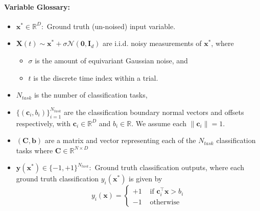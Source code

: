 \documentclass[12pt]{article}
\begin{document}
\paragraph{Variable Glossary: }
\begin{itemize}
    \item $\mathbf x^* \in \mathbb R^D: $ Ground truth (un-noised) input variable.
    \item $\mathbf X(t) \sim \mathbf x^* + \sigma \mathcal N(\mathbf 0, \mathbf I_d)$ are i.i.d. noisy measurements of $\mathbf x^*$, where 
    \begin{itemize}
        \item $\sigma$ is the amount of equivariant Gaussian noise, and 
        \item $t$ is the discrete time index within a trial.
    \end{itemize}
    \item $N_{task}$ is the number of classification tasks, 
    \item $\{(\mathbf c_i, b_i)\}_{i=1}^{N_{task}}$ are the classification boundary normal vectors and offsets respectively, with $\mathbf c_i \in \mathbb R^D$ and $b_i\in \mathbb R$. We assume each $\| \mathbf c_i \| = 1$.
    \item $(\mathbf C, \mathbf b)$ are a matrix and vector representing each of the $N_{task}$ classification tasks where $\mathbf C\in \mathbb R^{N\times D}$ 
    \item  $\mathbf y(\mathbf x^*) \in \{-1, +1\}^{N_{task}}:$ Ground truth classification outputs, where each ground truth classification $y_i(\mathbf x^*)$ is given by 
        \begin{equation}
        	\label{def:decision_rule}
        	y_i(\mathbf x) = \begin{cases}
        		+1 & \text{ if } \mathbf c_i^\top \mathbf x > b_i \\ 
        		-1 & \text{ otherwise } 
        	\end{cases}
        \end{equation}


\end{itemize}
\end{document}
